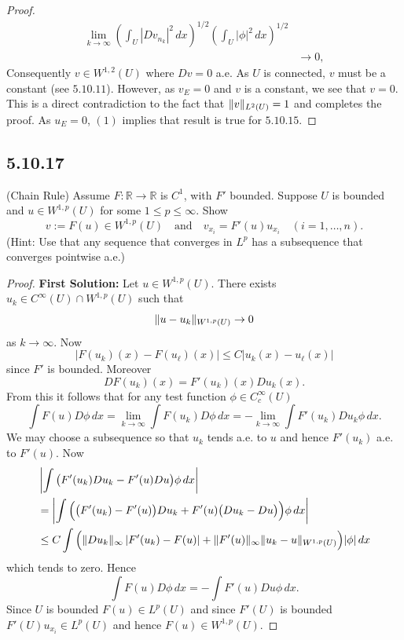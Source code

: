 \documentclass{article}
\DeclarePairedDelimiter{\norm}{\lVert}{\rVert}
\begin{document}
\begin{flushleft}
\begin{proof}
\begin{align*}
     \lim_{k\to\infty}\left(\int_U \left|Dv_{n_k}\right|^2\,dx\right)^{1/2}\left(\int_U \left|\phi\right|^2\,dx\right)^{1/2}\\&
     \to 0,
 \end{align*}
Consequently $v\in W^{1,2}(U)$ where $Dv=0$ a.e. As $U$ is connected, $v$ must be a constant (see $5.10.11$). However, as $v_E=0$ and $v$ is a constant, we see that $v = 0$. This is a direct contradiction to the fact that $\norm{v}_{L^2(U)}=1$ and completes the proof. As $u_E=0$, $(1)$ implies that result is true for $5.10.15$.
\end{proof}
\subsection{\textbf{5.10.17}} (Chain Rule) Assume $F:\mathbb R \to \mathbb R$ is $C^1$, with $F'$ bounded. Suppose $U$ is bounded and $u\in W^{1,p}(U)$ for some $1\le p \le \infty$. Show
$$v:=F(u)\in W^{1,p}(U)\quad\text{and}\quad v_{x_i}=F'(u)u_{x_i}\quad (i=1,\ldots,n).$$
(Hint: Use that any sequence that converges in $L^p$ has a subsequence that converges pointwise a.e.)

\begin{proof} \textbf{First Solution:} 
Let $u\in W^{1,p}(U)$. There exists $u_k\in C^{\infty}(U)\cap W^{1,p}(U)$ such that
$$\norm{u-u_k}_{W^{1,p}(U)}\to 0$$
as $k\to\infty$. Now
$$\left|F(u_k)(x) - F(u_\ell)(x)\right|\leq C|u_k(x)-u_\ell(x)|$$
since $F'$ is bounded. Moreover
$$DF(u_k)(x) =F'(u_k)(x)Du_k(x).$$
From this it follows that for any test function $\phi\in C_c^{\infty}(U)$
$$\int F(u)D\phi\,dx = \lim_{k\to\infty}\int F(u_k)D\phi\,dx = -\lim_{k\to\infty}\int F'(u_k)Du_k\phi\,dx.$$
We may choose a subsequence so that $u_k$ tends a.e. to $u$ and hence $F'(u_k)$ a.e. to $F'(u)$. Now
\begin{align*}
    &\left|\int \big(F'(u_k)Du_k - F'(u)Du\big)\phi\,dx \right|\\&=
    \left|\int \Big(\big(F'(u_k) - F'(u)\big)Du_k + F'(u)\big(Du_k - Du\big)\Big)\phi\,dx\right|\\&\leq
    C\int \Big(\norm{Du_k}_{\infty}\left|F'(u_k)-F(u)\right| + \norm{F'(u)}_{\infty}\norm{u_k - u}_{W^{1,p}(U)}\Big)|\phi|\,dx
\end{align*}
which tends to zero. Hence
$$\int F(u)D\phi\,dx = -\int F'(u)Du\phi\,dx.$$
Since $U$ is bounded $F(u)\in L^p(U)$ and since $F'(U)$ is bounded $F'(U)u_{x_i}\in L^p(U)$ and hence $F(u)\in W^{1,p}(U)$.


\end{proof}
\end{flushleft}
\end{document}
